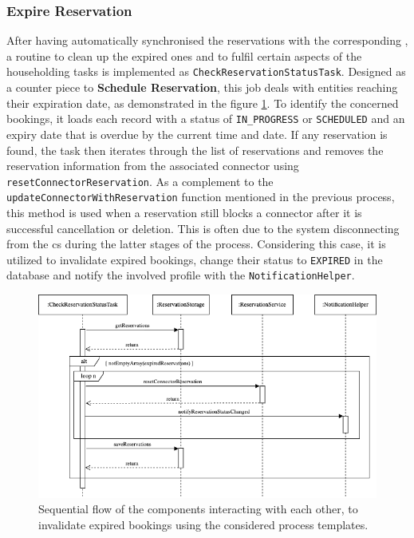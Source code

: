 \newpage

\subsubsection{Expire Reservation}
\label{ch:Implementation:sec:Reservation System:ssec:Scheduling Capabilities:sssec:Expire Reservation}

After having automatically synchronised the reservations with the corresponding , a routine to clean up the expired ones and to fulfil certain aspects of the householding tasks is implemented as \texttt{CheckReservationStatusTask}.
Designed as a counter piece to \textbf{Schedule Reservation}, this job deals with entities reaching their expiration date, as demonstrated in the figure \ref{fig:expire-reservation-seqflow}.
To identify the concerned bookings, it loads each record with a status of \texttt{IN\_PROGRESS} or \texttt{SCHEDULED} and an expiry date that is overdue by the current time and date.
If any reservation is found, the task then iterates through the list of reservations and removes the reservation information from the associated connector using \texttt{resetConnectorReservation}. 
As a complement to the \texttt{updateConnectorWithReservation} function mentioned in the previous process, this method is used when a reservation still blocks a connector after it is successful cancellation or deletion. This is often due to the system disconnecting from the \acrshort{cs} during the latter stages of the process.
Considering this case, it is utilized to invalidate expired bookings, change their status to \texttt{EXPIRED} in the database and notify the involved profile with the \texttt{NotificationHelper}.

\begin{figure}[h]
    \centering
    \includegraphics[scale=0.5]{resources/images/main/6_implementation/processes/scheduler/UpdateExpiredReservations.png}
    \caption{Sequential flow of the components interacting with each other, to invalidate expired bookings using the considered process templates.}
    \label{fig:expire-reservation-seqflow}
\end{figure}

